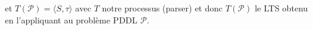 et $T(\mathcal{P}) = \langle S, \tau \rangle $ avec $T$ notre processus (parser) et donc $T(\mathcal{P})$ le LTS obtenu en l'appliquant au problème PDDL $\mathcal{P}$.



